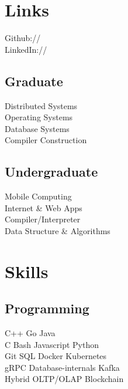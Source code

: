 \documentclass[]{deedy-resume-openfont}
\begin{document}
\begin{minipage}[t]{0.29\textwidth}
\section{Links} 
Github:// \href{https://github.com/shankur/}{} \\
LinkedIn://  \href{https://www.linkedin.com/in/shankur}{} \\
\sectionsep


\subsection{Graduate}
Distributed Systems \\
Operating Systems \\
Database Systems\\
Compiler Construction \\
\sectionsep

\subsection{Undergraduate}
Mobile Computing \\
Internet \& Web Apps \\
Compiler/Interpreter\\
Data Structure \& Algorithms\\
\sectionsep


\section{Skills}
\subsection{Programming}
C++ \textbullet{}   Go \textbullet{} Java \\
C \textbullet{} Bash \textbullet{} Javascript \textbullet{} Python \\
Git \textbullet{} SQL \textbullet{} Docker \textbullet{} Kubernetes \\
gRPC \textbullet{} Database-internals \textbullet{} Kafka \\
Hybrid OLTP/OLAP \textbullet{} Blockchain
\sectionsep


\end{minipage}
\end{document}
